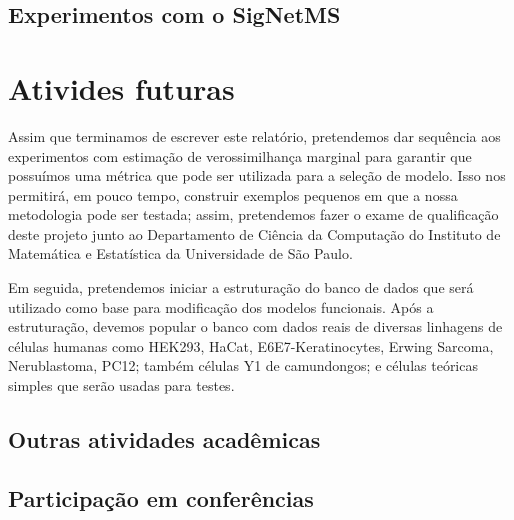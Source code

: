 \documentclass[12pt]{article}
\begin{document}
\subsection{Experimentos com o SigNetMS}


\section{Ativides futuras}
Assim que terminamos de escrever este relatório, pretendemos dar 
sequência aos experimentos com estimação de verossimilhança marginal 
para garantir que possuímos uma métrica que pode ser utilizada para a
seleção de modelo. Isso nos permitirá, em pouco tempo, construir 
exemplos pequenos em que a nossa metodologia pode ser testada; assim,
pretendemos fazer o exame de qualificação deste projeto junto ao 
Departamento de Ciência da Computação do Instituto de Matemática e 
Estatística da Universidade de São Paulo.

Em seguida, pretendemos iniciar a estruturação do banco de dados que 
será utilizado como base para modificação dos modelos funcionais. Após
a estruturação, devemos popular o banco com dados reais de diversas 
linhagens de células humanas como HEK293, HaCat, E6E7-Keratinocytes,
Erwing Sarcoma, Nerublastoma, PC12; também células Y1 de camundongos; e
células teóricas simples que serão usadas para testes.




\subsection{Outras atividades acadêmicas}

\subsection{Participação em conferências}


 

\end{document}
